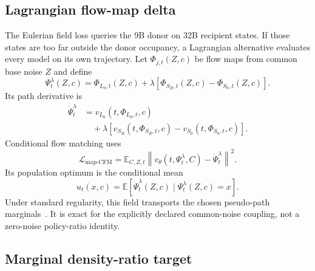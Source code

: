 \documentclass[11pt,a4paper]{article}
\newcommand{\E}{\mathbb{E}}
\newcommand{\norm}[1]{\left\lVert #1 \right\rVert}
\newcommand{\Sbase}{S_0}
\newcommand{\Srl}{S_R}
\newcommand{\Lbase}{L_0}
\theoremstyle{plain}
\theoremstyle{definition}
\begin{document}
\subsection{Lagrangian flow-map delta}

The Eulerian field loss queries the 9B donor on 32B recipient states.  If those states are too far
outside the donor occupancy, a Lagrangian alternative evaluates every model on its own trajectory.
Let $\Phi_{j,t}(Z,c)$ be flow maps from common base noise $Z$ and define
\begin{equation}
\Psi_t^\lambda(Z,c)
=
\Phi_{\Lbase,t}(Z,c)
+\lambda
\left[
\Phi_{\Srl,t}(Z,c)
-\Phi_{\Sbase,t}(Z,c)
\right].
\label{eq:flow-map-delta}
\end{equation}
Its path derivative is
\begin{align}
\dot\Psi_t^\lambda
&=
v_{\Lbase}(t,\Phi_{\Lbase,t},c)
\nonumber\\
&\quad+
\lambda
\left[
v_{\Srl}(t,\Phi_{\Srl,t},c)
-v_{\Sbase}(t,\Phi_{\Sbase,t},c)
\right].
\label{eq:flow-map-velocity}
\end{align}
Conditional flow matching uses
\begin{equation}
\mathcal L_{\mathrm{map\text{-}CFM}}
=
\E_{C,Z,t}
\norm{
v_\theta(t,\Psi_t^\lambda,C)
-\dot\Psi_t^\lambda
}^2.
\label{eq:flow-map-cfm}
\end{equation}
Its population optimum is the conditional mean
\begin{equation}
u_t(x,c)
=
\E[
\dot\Psi_t^\lambda(Z,c)
\mid
\Psi_t^\lambda(Z,c)=x
].
\label{eq:map-marginal-field}
\end{equation}
Under standard regularity, this field transports the chosen pseudo-path
marginals~\cite{flowmatching}.
It is exact for the explicitly declared common-noise coupling, not a zero-noise policy-ratio
identity.

\subsection{Marginal density-ratio target}
\end{document}
